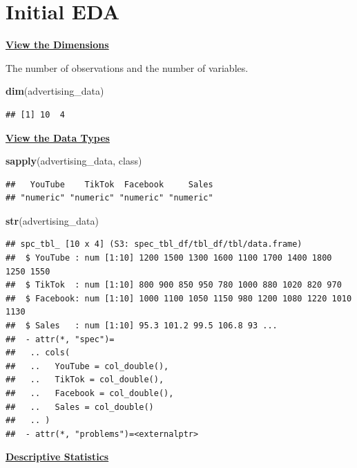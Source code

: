 \documentclass[
]{article}
\newenvironment{Shaded}{\begin{snugshade}}{\end{snugshade}}
\newcommand{\FunctionTok}[1]{\textcolor[rgb]{0.13,0.29,0.53}{\textbf{#1}}}
\newcommand{\NormalTok}[1]{#1}
\begin{document}
\section{Initial EDA}\label{initial-eda}

\ul{\textbf{View the Dimensions}}

The number of observations and the number of variables.

\begin{Shaded}
\begin{Highlighting}[]
\FunctionTok{dim}\NormalTok{(advertising\_data)}
\end{Highlighting}
\end{Shaded}

\begin{verbatim}
## [1] 10  4
\end{verbatim}

\ul{\textbf{View the Data Types}}

\begin{Shaded}
\begin{Highlighting}[]
\FunctionTok{sapply}\NormalTok{(advertising\_data, class)}
\end{Highlighting}
\end{Shaded}

\begin{verbatim}
##   YouTube    TikTok  Facebook     Sales 
## "numeric" "numeric" "numeric" "numeric"
\end{verbatim}

\begin{Shaded}
\begin{Highlighting}[]
\FunctionTok{str}\NormalTok{(advertising\_data)}
\end{Highlighting}
\end{Shaded}

\begin{verbatim}
## spc_tbl_ [10 x 4] (S3: spec_tbl_df/tbl_df/tbl/data.frame)
##  $ YouTube : num [1:10] 1200 1500 1300 1600 1100 1700 1400 1800 1250 1550
##  $ TikTok  : num [1:10] 800 900 850 950 780 1000 880 1020 820 970
##  $ Facebook: num [1:10] 1000 1100 1050 1150 980 1200 1080 1220 1010 1130
##  $ Sales   : num [1:10] 95.3 101.2 99.5 106.8 93 ...
##  - attr(*, "spec")=
##   .. cols(
##   ..   YouTube = col_double(),
##   ..   TikTok = col_double(),
##   ..   Facebook = col_double(),
##   ..   Sales = col_double()
##   .. )
##  - attr(*, "problems")=<externalptr>
\end{verbatim}

\ul{\textbf{Descriptive Statistics}}
\end{document}
